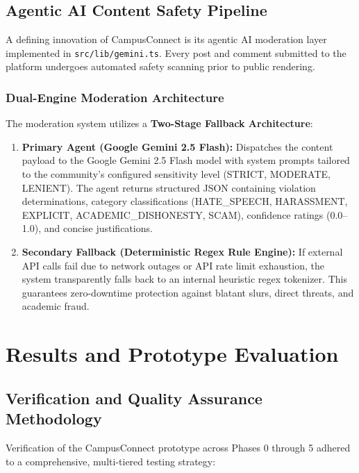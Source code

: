 \documentclass[11pt,a4paper]{report}
\begin{document}
\section{Agentic AI Content Safety Pipeline}

A defining innovation of CampusConnect is its agentic AI moderation layer implemented in \texttt{src/lib/gemini.ts}. Every post and comment submitted to the platform undergoes automated safety scanning prior to public rendering.

\subsection{Dual-Engine Moderation Architecture}

The moderation system utilizes a \textbf{Two-Stage Fallback Architecture}:

\begin{enumerate}
    \item \textbf{Primary Agent (Google Gemini 2.5 Flash):} Dispatches the content payload to the Google Gemini 2.5 Flash model with system prompts tailored to the community's configured sensitivity level (STRICT, MODERATE, LENIENT). The agent returns structured JSON containing violation determinations, category classifications (HATE\_SPEECH, HARASSMENT, EXPLICIT, ACADEMIC\_DISHONESTY, SCAM), confidence ratings (0.0--1.0), and concise justifications.
    \item \textbf{Secondary Fallback (Deterministic Regex Rule Engine):} If external API calls fail due to network outages or API rate limit exhaustion, the system transparently falls back to an internal heuristic regex tokenizer. This guarantees zero-downtime protection against blatant slurs, direct threats, and academic fraud.
\end{enumerate}

\chapter{Results and Prototype Evaluation}

\section{Verification and Quality Assurance Methodology}

Verification of the CampusConnect prototype across Phases 0 through 5 adhered to a comprehensive, multi-tiered testing strategy:
\end{document}
